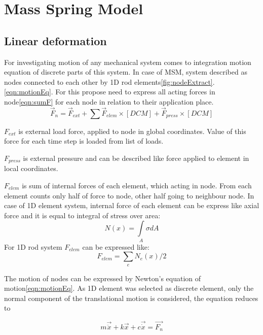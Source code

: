 \section*{Mass Spring Model}
\subsection*{Linear deformation}
For investigating motion of any mechanical system comes to integration motion equation of
discrete parts of this system. In case of MSM, system described as nodes connected to each other 
by 1D rod elements\ref{fig:nodeExtract}. \eqref{eqn:motionEq}. For this propose need to express all acting forces in
node\eqref{eqn:sumF} for each node in relation to their application place.
\begin{equation}\label{eqn:sumF}
  \vec{F}_n= \vec{F}_{ext} + \sum\vec{F}_{elem}\times[DCM] + \vec{F}_{press}\times[DCM]
\end{equation}\par
$F_{ext}$ is external load force, applied to node in global coordinates. Value of this force for
each time step is loaded from list of loads.\par $F_{press}$ is external pressure and can be
described like force applied to element in local coordinates.\par $F_{elem}$ is sum of internal
forces of each element, which acting in node. From each element counts only half of force to node,
other half going to neighbour node. In case of 1D element system, internal force of each element can
be express like axial force and it is equal to integral of stress over area:
\begin{equation}\label{eqn:Nx}
  N(x)= \int\limits_A \sigma dA
\end{equation}
For 1D rod system $F_{elem}$ can be expressed like:
\begin{equation}\label{eqn:Felem}
  F_{elem} = \sum_{e}N_e(x)/2
\end{equation}\par
The motion of nodes can be expressed by Newton's equation of motion\ref{eqn:motionEq}. As 1D
element was selected as discrete element, only the normal component of the
translational motion is considered, the equation reduces to\par
\begin{equation}\label{eqn:motionEq}
  m\vec{\ddot{x}} + k\vec{x} + c\vec{\dot{x}} = \vec{F_n}
\end{equation}
